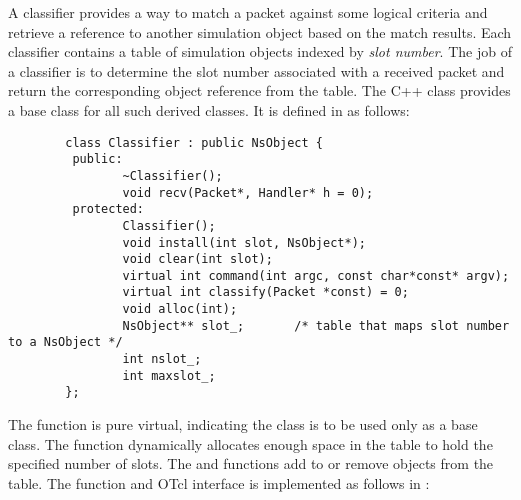 A classifier provides a way to match a packet against some
logical criteria and retrieve a reference to another simulation
object based on the match results.
Each classifier contains a table of simulation objects indexed
by {\em slot number}.
The job of a classifier is to determine the slot number associated
with a received packet and return the corresponding object reference
from the table.
The C++ class  provides a base class for all such
derived classes.  It is defined in  as follows:
\begin{small}
\begin{verbatim}
        class Classifier : public NsObject {
         public:
                ~Classifier();
                void recv(Packet*, Handler* h = 0);
         protected:
                Classifier();
                void install(int slot, NsObject*);
                void clear(int slot);
                virtual int command(int argc, const char*const* argv);
                virtual int classify(Packet *const) = 0;
                void alloc(int);
                NsObject** slot_;       /* table that maps slot number to a NsObject */
                int nslot_;
                int maxslot_;
        };
\end{verbatim}
\end{small}
The  function is pure virtual, indicating the
class  is to be used only as a base class.
The  function dynamically allocates enough space
in the table to hold the specified number of slots.
The  and  functions add to or remove
objects from the table.
The  function and OTcl interface is implemented
as follows in :

